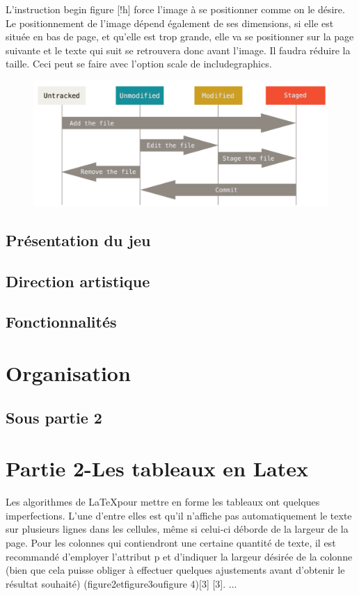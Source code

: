 \documentclass[12pt,a4paper, twoside]{article}
\begin{document}
    L’instruction \/begin figure [!h] force l’image à se positionner comme on le désire. Le positionnement de l’image dépend également de ses dimensions, si elle est située en bas de page, et qu’elle est trop grande, elle va se positionner sur la page suivante et le texte qui suit se retrouvera donc avant l’image. Il faudra réduire la taille. Ceci peut se faire avec l’option scale de includegraphics.
\newpage


\begin{figure}[h]
    \centering
    \includegraphics[width=1\textwidth]{image.png}
    \label{fig:logo}
\end{figure}
\subsection{Présentation du jeu}
\subsection{Direction artistique}
\subsection{Fonctionnalités}
\section{Organisation}
\subsection{}
\subsection{Sous partie 2}
\section{Partie 2-Les tableaux en Latex}

    Les algorithmes de \LaTeX pour mettre en forme les tableaux ont quelques imperfections. L’une d’entre elles est qu’il n’affiche pas automatiquement le texte sur plusieurs lignes dans les cellules, même si celui-ci déborde de la largeur de la page. Pour les colonnes qui contiendront une certaine quantité de texte, il est recommandé d’employer l’attribut p et d’indiquer la largeur désirée de la colonne (bien que cela puisse obliger à effectuer quelques ajustements avant d’obtenir le résultat souhaité) (figure2etfigure3oufigure 4)[3] [3]. ...
\end{document}
